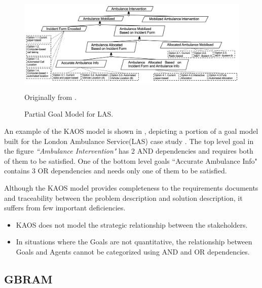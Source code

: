 \begin{figure}[hbtp]
    \centering
    \includegraphics[width=\textwidth]{Chapter-2/figs/KAOS}
    \caption{Partial Goal Model for LAS.}
    \medskip
    \small
    Originally from \cite{heaven11}.
    \label{fig:kaos}
\end{figure}

An example of the KAOS model is shown in , depicting a portion of a goal model built for the London Ambulance Service(LAS) case study \cite{finkelstein96}. The top level goal in the figure \textit{``Ambulance Intervention"} has 2 AND dependencies and requires both of them to be satisfied. One of the bottom level goals ``Accurate Ambulance Info" contains 3 OR dependencies and needs only one of them to be satisfied.

Although the KAOS model provides completeness to the requirements documents and traceability between the problem description and solution description, it suffers from few important deficiencies.
\begin{itemize}
    \item KAOS does not model the strategic relationship between the stakeholders.
    \item In situations where the Goals are not quantitative, the relationship between Goals and Agents cannot be categorized using AND and OR dependencies.
\end{itemize}

\subsection{GBRAM}
\label{subsec:bg:gm:gbram}

